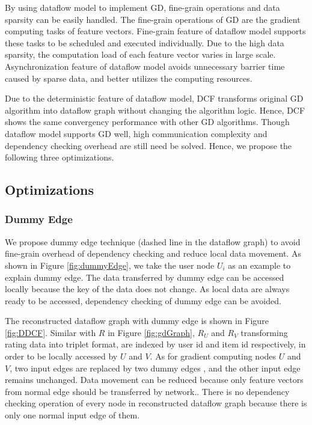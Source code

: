 \documentclass{llncs}
\begin{document}
\vspace{-5pt}

By using dataflow model to implement GD, fine-grain operations and data sparsity can be easily handled. The fine-grain operations of GD are the gradient computing tasks of feature vectors. Fine-grain feature of dataflow model supports these tasks to be scheduled and executed individually. Due to the high data sparsity, the computation load of each feature vector varies in large scale. Asynchronization feature of dataflow model avoids unnecessary barrier time caused by sparse data, and better utilizes the computing resources.


Due to the deterministic feature of dataflow model, DCF transforms original GD algorithm into dataflow graph without changing the algorithm logic. Hence, DCF shows the same convergency performance with other GD algorithms. Though dataflow model supports GD well, high communication complexity and dependency checking overhead are still need be solved. Hence, we propose the following three optimizations.

\vspace{-10pt}
\subsection{Optimizations}
\subsubsection{Dummy Edge}

We propose dummy edge technique (dashed line in the dataflow graph) to avoid fine-grain overhead of dependency checking and reduce local data movement. As shown in Figure \ref{fig:dummyEdge}, we take the user node $U_i$ as an example to explain dummy edge. The data transferred by dummy edge can be accessed locally because the key of the data does not change. As local data are always ready to be accessed, dependency checking of dummy edge can be avoided.

The reconstructed dataflow graph with dummy edge is shown in Figure \ref{fig:DDCF}. Similar with $R$ in Figure \ref{fig:gdGraph}, $R_U$ and $R_V$ transforming rating data into triplet format, are indexed by user id and item id respectively, in order to be locally accessed by $U$ and $V$. As for gradient computing nodes $U$ and $V$, two input edges are replaced by two dummy edges , and the other input edge remains unchanged. Data movement can be reduced because only feature vectors from normal edge
should be transferred by network..
There is no dependency checking operation of every node in reconstructed dataflow graph because there is only one normal input edge of them.
\vspace{-15pt}
\end{document}
